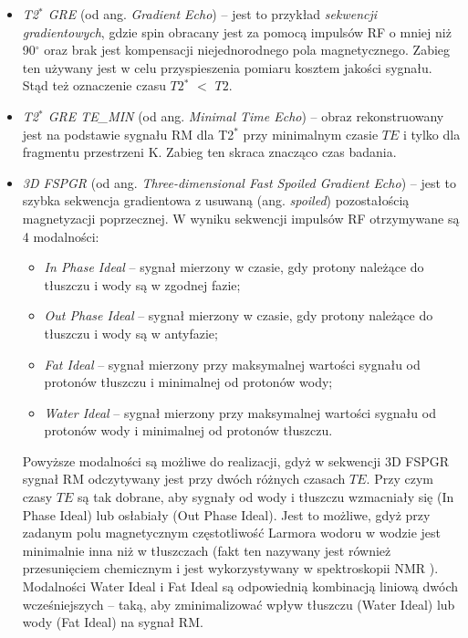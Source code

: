 \begin{itemize}[noitemsep,nolistsep]
	\item \textit{T2$^\ast$ GRE} (od ang. \textit{Gradient Echo}) -- jest to przykład \textit{sekwencji gradientowych}, gdzie spin obracany jest za pomocą impulsów RF o mniej niż 90$^\circ$ oraz brak jest kompensacji niejednorodnego pola magnetycznego. Zabieg ten używany jest w celu przyspieszenia pomiaru kosztem jakości sygnału. Stąd też oznaczenie czasu $T2$$^\ast$ $<$ $T2$. 
	\item \textit{T2$^\ast$ GRE TE\_MIN} (od ang. \textit{Minimal Time Echo}) -- obraz rekonstruowany jest na podstawie sygnału RM dla T2$^\ast$  przy minimalnym czasie $TE$ i tylko dla fragmentu przestrzeni K. Zabieg ten skraca znacząco czas badania.
	\item \textit{3D FSPGR} (od ang. \textit{Three-dimensional Fast Spoiled Gradient Echo}) -- jest to szybka sekwencja gradientowa z usuwaną (ang. \textit{spoiled}) pozostałością magnetyzacji poprzecznej. W wyniku sekwencji impulsów RF otrzymywane są 4 modalności: 
	\begin{itemize}[noitemsep,nolistsep]
		\item \textit{In Phase Ideal} -- sygnał mierzony w czasie, gdy protony należące do tłuszczu i wody są w zgodnej fazie;
		\item \textit{Out Phase Ideal} -- sygnał mierzony w czasie, gdy protony należące \linebreak do tłuszczu i wody są w antyfazie;
		\item \textit{Fat Ideal} -- sygnał mierzony przy maksymalnej wartości sygnału od protonów tłuszczu i minimalnej od protonów wody;
		\item \textit{Water Ideal} -- sygnał mierzony przy maksymalnej wartości sygnału \linebreak od protonów wody i minimalnej od protonów tłuszczu.
	\end{itemize}
	Powyższe modalności są możliwe do realizacji, gdyż w sekwencji 3D FSPGR sygnał RM odczytywany jest przy dwóch różnych czasach $TE$. Przy czym czasy $TE$ są tak dobrane, aby sygnały od wody i tłuszczu wzmacniały się (In Phase Ideal) lub osłabiały (Out Phase Ideal). Jest to możliwe, gdyż przy zadanym polu magnetycznym częstotliwość Larmora wodoru w wodzie jest minimalnie inna niż w tłuszczach (fakt ten nazywany jest również przesunięciem chemicznym i jest wykorzystywany w spektroskopii NMR \cite{lide2006crc}). Modalności Water Ideal i Fat Ideal są odpowiednią kombinacją liniową dwóch wcześniejszych -- taką, aby zminimalizować wpływ tłuszczu (Water Ideal) lub wody (Fat Ideal) na sygnał RM.
\end{itemize}

